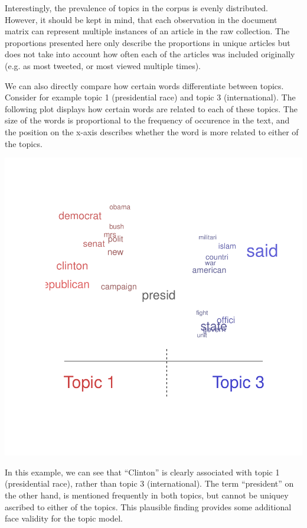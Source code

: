 \documentclass[12pt]{article}\usepackage[]{graphicx}\usepackage[]{color}
\makeatletter
\def\maxwidth{ %
  \ifdim\Gin@nat@width>\linewidth
    \linewidth
  \else
    \Gin@nat@width
  \fi
}
\newenvironment{knitrout}{}{} %
\makeatother
\begin{document}
Interestingly, the prevalence of topics in the corpus is evenly distributed. However, it should be kept in mind, that each observation in the document matrix can represent multiple instances of an article in the raw collection. The proportions presented here only describe the proportions in unique articles but does not take into account how often each of the articles was included originally (e.g. as most tweeted, or most viewed multiple times). 

We can also directly compare how certain words differentiate between topics. Consider for example topic 1 (presidential race) and topic 3 (international). The following plot displays how certain words are related to each of these topics. The size of the words is proportional to the frequency of occurence in the text, and the position on the x-axis describes whether the word is more related to either of the topics.

\begin{knitrout}
\color{fgcolor}
\includegraphics[width=\maxwidth]{figure/unnamed-chunk-6-1} 

\end{knitrout}

In this example, we can see that ``Clinton'' is clearly associated with topic 1 (presidential race), rather than topic 3 (international). The term ``president'' on the other hand, is mentioned frequently in both topics, but cannot be uniquey ascribed to either of the topics. This plausible finding provides some additional face validity for the topic model.
\end{document}
